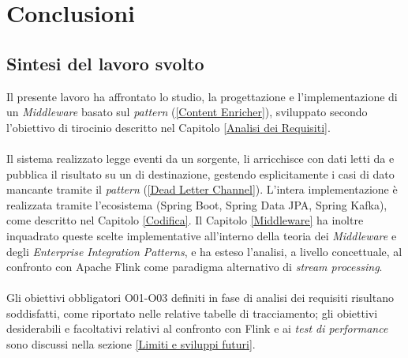 \chapter{Conclusioni}
\label{Conclusioni}

\section{Sintesi del lavoro svolto}
Il presente lavoro ha affrontato lo studio, la progettazione e l'implementazione di un \textit{Middleware} basato sul \textit{pattern}  (\ref{Content Enricher}), sviluppato secondo l'obiettivo di tirocinio descritto nel Capitolo \ref{Analisi dei Requisiti}. \\ \\
Il sistema realizzato legge eventi da un \textit{}  sorgente, li arricchisce con dati letti da  e pubblica il risultato su un \textit{} di destinazione, gestendo esplicitamente i casi di dato mancante tramite il \textit{pattern}  (\ref{Dead Letter Channel}). 
L'intera implementazione è realizzata tramite l'ecosistema  (Spring Boot, Spring Data JPA, Spring Kafka), come descritto nel Capitolo \ref{Codifica}. 
Il Capitolo \ref{Middleware} ha inoltre inquadrato queste scelte implementative all'interno della teoria dei \textit{Middleware} e degli \textit{Enterprise Integration Patterns}, e ha esteso l'analisi, a livello concettuale, al confronto con Apache Flink come paradigma alternativo di \textit{stream processing}. \\ \\
Gli obiettivi obbligatori O01-O03 definiti in fase di analisi dei requisiti risultano soddisfatti, come riportato nelle relative tabelle di tracciamento; gli obiettivi desiderabili e facoltativi relativi al confronto con Flink e ai \textit{test di performance} sono discussi nella sezione \ref{Limiti e sviluppi futuri}.

\newpage
